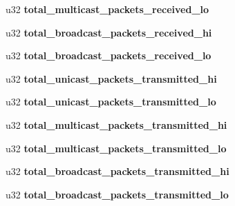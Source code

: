 \begin{DoxyCompactItemize}
\item 
\hypertarget{structhost__func__stats_ab072f4bf15540ddd78b69703f7da748a}{
u32 {\bfseries total\_\-multicast\_\-packets\_\-received\_\-lo}}
\label{structhost__func__stats_ab072f4bf15540ddd78b69703f7da748a}

\item 
\hypertarget{structhost__func__stats_a2b98e6ea5fef2523536da63bb0bab335}{
u32 {\bfseries total\_\-broadcast\_\-packets\_\-received\_\-hi}}
\label{structhost__func__stats_a2b98e6ea5fef2523536da63bb0bab335}

\item 
\hypertarget{structhost__func__stats_a5a6b0818928f95f38beb775559329233}{
u32 {\bfseries total\_\-broadcast\_\-packets\_\-received\_\-lo}}
\label{structhost__func__stats_a5a6b0818928f95f38beb775559329233}

\item 
\hypertarget{structhost__func__stats_acd0c0dcbf237e57c69479cec921cf564}{
u32 {\bfseries total\_\-unicast\_\-packets\_\-transmitted\_\-hi}}
\label{structhost__func__stats_acd0c0dcbf237e57c69479cec921cf564}

\item 
\hypertarget{structhost__func__stats_ae9bee2848c4207720914b81b85152c4c}{
u32 {\bfseries total\_\-unicast\_\-packets\_\-transmitted\_\-lo}}
\label{structhost__func__stats_ae9bee2848c4207720914b81b85152c4c}

\item 
\hypertarget{structhost__func__stats_a07edf476f79a498af1b86c681b411283}{
u32 {\bfseries total\_\-multicast\_\-packets\_\-transmitted\_\-hi}}
\label{structhost__func__stats_a07edf476f79a498af1b86c681b411283}

\item 
\hypertarget{structhost__func__stats_afea5a43dfc3c3fdf1df6dafb6952b70a}{
u32 {\bfseries total\_\-multicast\_\-packets\_\-transmitted\_\-lo}}
\label{structhost__func__stats_afea5a43dfc3c3fdf1df6dafb6952b70a}

\item 
\hypertarget{structhost__func__stats_ac4b6fb1f3603fd339ead46425feafcf7}{
u32 {\bfseries total\_\-broadcast\_\-packets\_\-transmitted\_\-hi}}
\label{structhost__func__stats_ac4b6fb1f3603fd339ead46425feafcf7}

\item 
\hypertarget{structhost__func__stats_ac0d8535c3b1559bc081c1907b5d0535c}{
u32 {\bfseries total\_\-broadcast\_\-packets\_\-transmitted\_\-lo}}
\label{structhost__func__stats_ac0d8535c3b1559bc081c1907b5d0535c}


\end{DoxyCompactItemize}
